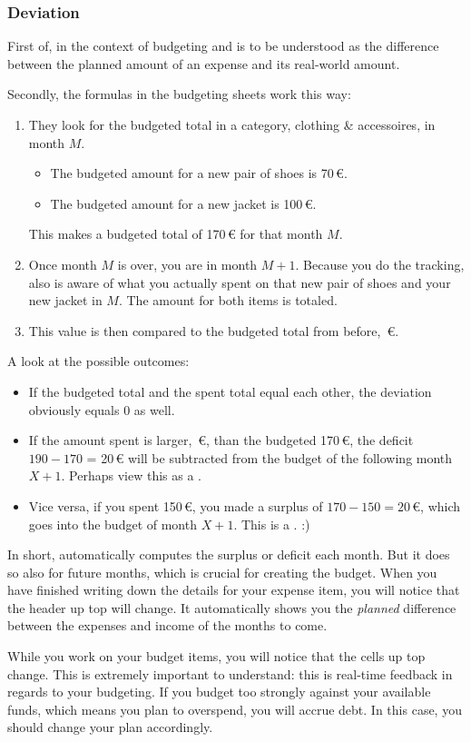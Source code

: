 \subsubsection{Deviation}
\label{subsubsec:budeting-deviation}

First of,  in the context of budgeting and \tfn is to be understood as the difference between the planned amount of an expense and its real-world amount.

Secondly, the formulas in the budgeting sheets work this way:
\begin{enumerate}
	\item They look for the budgeted total in a category, \eg clothing \& accessoires, in month \( M \).
	\begin{itemize}
		\item The budgeted amount for a new pair of shoes is 70\,€.
		\item The budgeted amount for a new jacket is 100\,€.
	\end{itemize}
	This makes a budgeted total of 170\,€ for that month \( M \).
	\item Once month \( M \) is over, you are in month \( M+1 \).
	Because you do the tracking, \tfn also is aware of what you actually spent on that new pair of shoes and your new jacket in \( M \).
	The amount for both items is totaled.
	\item This value is then compared to the budgeted total from before, \,€.
\end{enumerate}

A look at the possible outcomes:
\begin{itemize}
	\item If the budgeted total and the spent total equal each other, the deviation obviously equals 0 as well.
	\item If the amount spent is larger, \,€, than the budgeted 170\,€, the deficit \( 190-170 \) = 20\,€ will be subtracted from the budget of the following month \( X+1 \).
	Perhaps view this as a .
	\item Vice versa, if you spent 150\,€, you made a surplus of \( 170-150 = 20 \)\,€, which goes into the budget of month \( X+1 \).
	This is a . :)
\end{itemize}
In short, \tfn automatically computes the surplus or deficit each month.
But it does so also for future months, which is crucial for creating the budget.
When you have finished writing down the details for your expense item, you will notice that the header up top will change.
It automatically shows you the \emph{planned} difference between the expenses and income of the months to come.
\begin{specialnote}
	While you work on your budget items, you will notice that the cells up top change.
	This is extremely important to understand: this is real-time feedback in regards to your budgeting.
	If you budget too strongly against your available funds, which means you plan to overspend, you will accrue debt.
	In this case, you should change your plan accordingly.
\end{specialnote}

